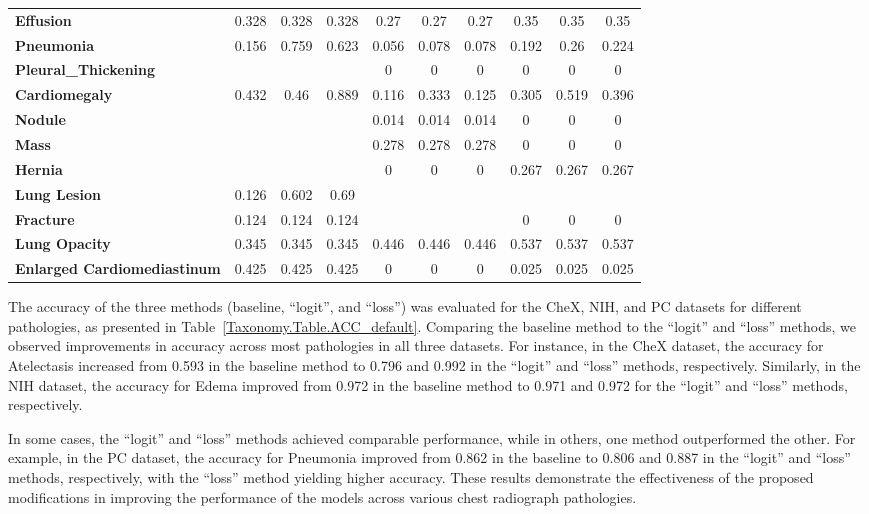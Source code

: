 \documentclass[preprint,3p,times, review]{elsarticle}
\begin{document}
\begin{table}[]
{\begin{tabular}{lccccccccc}
\textbf{Effusion}                     & 0.328 & 0.328 & 0.328 & 0.27  & 0.27  & 0.27  & 0.35  & 0.35  & 0.35  \\
\textbf{Pneumonia}                    & 0.156 & 0.759 & 0.623 & 0.056 & 0.078 & 0.078 & 0.192 & 0.26  & 0.224 \\
\textbf{Pleural\_Thickening}          &       &       &       & 0     & 0     & 0     & 0     & 0     & 0     \\
\textbf{Cardiomegaly}                 & 0.432 & 0.46  & 0.889 & 0.116 & 0.333 & 0.125 & 0.305 & 0.519 & 0.396 \\
\textbf{Nodule}                       &       &       &       & 0.014 & 0.014 & 0.014 & 0     & 0     & 0     \\
\textbf{Mass}                         &       &       &       & 0.278 & 0.278 & 0.278 & 0     & 0     & 0     \\
\textbf{Hernia}                       &       &       &       & 0     & 0     & 0     & 0.267 & 0.267 & 0.267 \\
\textbf{Lung Lesion}                  & 0.126 & 0.602 & 0.69  &       &       &       &       &       &       \\
\textbf{Fracture}                     & 0.124 & 0.124 & 0.124 &       &       &       & 0     & 0     & 0     \\
\textbf{Lung Opacity}                 & 0.345 & 0.345 & 0.345 & 0.446 & 0.446 & 0.446 & 0.537 & 0.537 & 0.537 \\
\textbf{Enlarged   Cardiomediastinum} & 0.425 & 0.425 & 0.425 & 0     & 0     & 0     & 0.025 & 0.025 & 0.025
\end{tabular}%
}\label{Taxonomy.Table.F1}
\end{table}


The accuracy of the three methods (baseline, ``logit'', and ``loss'') was evaluated for the CheX, NIH, and PC datasets for different pathologies, as presented in Table~\ref{Taxonomy.Table.ACC_default}. Comparing the baseline method to the ``logit'' and ``loss'' methods, we observed improvements in accuracy across most pathologies in all three datasets. For instance, in the CheX dataset, the accuracy for Atelectasis increased from 0.593 in the baseline method to 0.796 and 0.992 in the ``logit'' and ``loss'' methods, respectively. Similarly, in the NIH dataset, the accuracy for Edema improved from 0.972 in the baseline method to 0.971 and 0.972 for the ``logit'' and ``loss'' methods, respectively.

In some cases, the ``logit'' and ``loss'' methods achieved comparable performance, while in others, one method outperformed the other. For example, in the PC dataset, the accuracy for Pneumonia improved from 0.862 in the baseline to 0.806 and 0.887 in the ``logit'' and ``loss'' methods, respectively, with the ``loss'' method yielding higher accuracy. These results demonstrate the effectiveness of the proposed modifications in improving the performance of the models across various chest radiograph pathologies.
\end{document}
